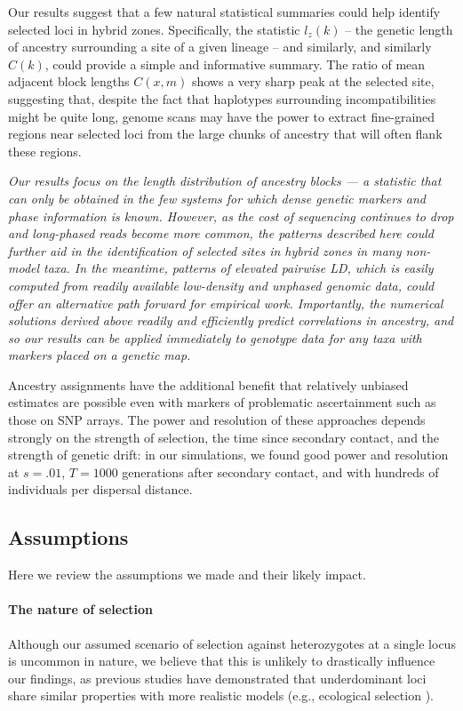 \documentclass[11pt,letterpaper]{article}
\newcommand{\yb}[1]{{\em \color{magenta} #1}}
\begin{document}
Our results suggest that a few natural statistical summaries could help identify selected loci in hybrid zones. 
Specifically, the statistic $l_z(k)$ -- the genetic length of ancestry surrounding a site of a given lineage -- and similarly,  and similarly $C(k)$, could provide a simple and informative summary. 
The ratio of mean adjacent block lengths $C(x,m)$ shows a very sharp peak at the selected site,
suggesting that, despite the fact that haplotypes surrounding incompatibilities might be quite long, 
genome scans may have the power to extract fine-grained regions near selected loci from the large chunks of ancestry that will often flank these regions. 

\yb{Our results focus on the length distribution of ancestry blocks --- a statistic that can only be obtained in the few systems for which dense genetic markers and phase information is known. 
However, as the cost of sequencing continues to drop and long-phased reads become more common, the patterns described here could further aid in the identification of selected sites in hybrid zones in many non-model taxa. 
In the meantime, patterns of elevated pairwise LD, which is easily computed from readily available low-density and unphased genomic data, could offer an alternative path forward for empirical work. 
Importantly, the numerical solutions derived above readily and efficiently predict correlations in ancestry, and so our results can be applied immediately to genotype data for any taxa with markers placed on a genetic map.}    

Ancestry assignments have the additional benefit that relatively unbiased estimates are possible even with markers of problematic ascertainment
such as those on SNP arrays.
The power and resolution of these approaches depends strongly on the strength of selection,
the time since secondary contact,
and the strength of genetic drift:
in our simulations,
we found good power and resolution at $s=.01$, $T=1000$ generations after secondary contact,
and with hundreds of individuals per dispersal distance.



\subsection*{Assumptions}

Here we review the assumptions we made and their likely impact.

\paragraph{The nature of selection}
Although our assumed scenario of selection against heterozygotes at a single locus is uncommon in nature, we believe that this is unlikely to drastically influence our findings, as previous studies have demonstrated that underdominant loci share similar properties with more realistic models (e.g., ecological selection \citep{Barton1989,Barton1993}). 
\end{document}
